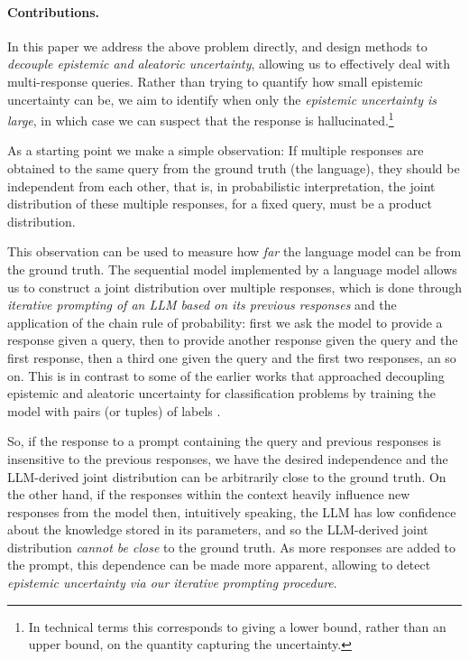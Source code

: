 \documentclass[a4paper]{article}
\theoremstyle{plain}
\theoremstyle{definition}
\theoremstyle{plain}
\begin{document}
\paragraph{Contributions.}
%
%
In this paper we address the above problem directly, and design methods to \emph{decouple
  epistemic and aleatoric uncertainty}, allowing us to effectively deal with
multi-response queries.  Rather than trying to quantify how small epistemic uncertainty can be, we aim to identify when only the \emph{epistemic uncertainty is large}, in which case we can suspect that the response is hallucinated.\footnote{In technical terms this corresponds to giving a
  lower bound, rather than an upper bound, on the quantity capturing the
  uncertainty.}

As a starting point we make a simple observation: If multiple
responses are obtained to the same query from the ground truth (the language), they should be
independent from each other, that is, in probabilistic interpretation, the joint
distribution of these multiple responses, for a fixed query, must be a product
distribution.

This observation can be used to measure how \emph{far} the language model can be
from the ground truth.  The sequential model implemented by a language model
allows us to construct a joint distribution over multiple responses, which is
done through \emph{iterative prompting of an LLM based on its previous
  responses} and the application of the chain rule of probability: first we ask
the model to provide a response given a query, then to provide another response
given the query and the first response, then a third one given the query and the
first two responses, an so on.  This is in contrast to some of the earlier works
that approached decoupling epistemic and aleatoric uncertainty for
classification problems  by training the model with
pairs (or tuples) of labels \citep{wen2022predictions, johnson2024experts}.

So, if the response to a prompt containing the query and previous responses is insensitive to the previous responses, we have the desired independence and the LLM-derived joint distribution can
be arbitrarily close to the ground truth.  On the other hand, if the responses within the context heavily influence new responses from the model then, intuitively speaking, the LLM has low confidence about the knowledge stored in its parameters, and so the LLM-derived joint
distribution \emph{cannot be close} to the ground truth. As more responses are added to the prompt, this dependence can be made more apparent, allowing to detect \emph{epistemic uncertainty via our iterative prompting procedure}.
\end{document}
